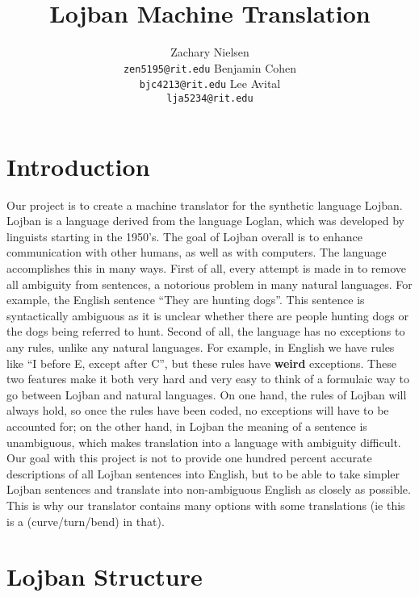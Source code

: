 \documentclass[11pt,letterpaper]{article}
\title{Lojban Machine Translation}
\author{Zachary Nielsen\\
	    {\tt zen5195@rit.edu}
	  \And
	Benjamin Cohen\\
              {\tt bjc4213@rit.edu}
	  \And
	Lee Avital\\
	   {\tt lja5234@rit.edu}}
\date{}
\begin{document}
\maketitle


\section{Introduction}

	Our project is to create a machine translator for the synthetic language Lojban. Lojban is a language derived from the language Loglan, which was developed by linguists starting in the 1950’s. The goal of Lojban overall is to enhance communication with other humans, as well as with computers. The language accomplishes this in many ways. First of all, every attempt is made in to remove all ambiguity from sentences, a notorious problem in many natural languages. For example, the English sentence \textquotedblleft They are hunting dogs\textquotedblright.  This sentence is syntactically ambiguous as it is unclear whether there are people hunting dogs or the dogs being referred to hunt.  Second of all, the language has no exceptions to any rules, unlike any natural languages. For example, in English we have rules like “I before E, except after C”, but these rules have \textbf{weird} exceptions.  These two features make it both very hard and very easy to think of a formulaic way to go between Lojban and natural languages. On one hand, the rules of Lojban will always hold, so once the rules have been coded, no exceptions will have to be accounted for; on the other hand, in Lojban the meaning of a sentence is unambiguous, which makes translation into a language with ambiguity difficult. Our goal with this project is not to provide one hundred percent accurate descriptions of all Lojban sentences into English, but to be able to take simpler Lojban sentences and translate into non-ambiguous English as closely as possible.  This is why our translator contains many options with some translations (ie this is a (curve/turn/bend) in that).  

\section{Lojban Structure}
\end{document}

